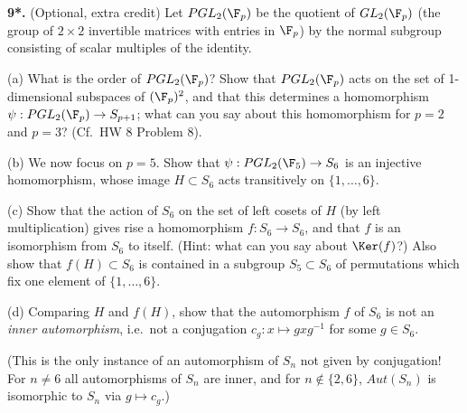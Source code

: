 \documentclass[11pt,letterpaper]{article}
\begin{document}
\pagebreak
{\bf 9*.} (Optional, extra credit) 
Let $PGL_2(\F_p)$ be the quotient of
$GL_2(\F_p)$ (the group of
$2\times 2$ invertible matrices with entries in $\F_p$) by the normal subgroup consisting of scalar multiples of the
identity. 

(a) What is the order of $PGL_2(\F_p)$? Show that $PGL_2(\F_p)$ acts on the
set of 1-dimensional subspaces of $(\F_p)^2$, and that this determines
a homomorphism $\psi:PGL_2(\F_p)\to S_{p+1}$;
what can you say about this homomorphism for $p=2$ and $p=3$?
(Cf.\ HW 8 Problem 8).

(b) We now focus on $p=5$. Show that $\psi:PGL_2(\F_5)\to S_6$ 
is an injective homomorphism, whose image $H\subset S_6$ acts transitively
on $\{1,\dots,6\}$.

(c) Show that the action of $S_6$ on the set of left cosets of $H$ (by left
multiplication) gives rise a homomorphism $f:S_6\to S_6$, and that
$f$ is an isomorphism from $S_6$ to itself. (Hint: what can you say about
$\Ker(f)$?)
Also show that $f(H)\subset S_6$ is contained in a subgroup $S_5\subset S_6$
of permutations which fix one element of $\{1,\dots,6\}$.

(d) Comparing $H$ and $f(H)$, show that the automorphism $f$ of $S_6$ 
is not an {\em inner automorphism}, i.e.\ not a conjugation $c_g:x\mapsto
gxg^{-1}$ for some $g\in S_6$.

(This is the only instance of an automorphism of $S_n$ not given by 
conjugation! For $n\neq 6$ all automorphisms of $S_n$ are inner, and for
$n\not\in \{2,6\}$, $Aut(S_n)$ is isomorphic to $S_n$ via $g\mapsto c_g$.)
\medskip
\end{document}
